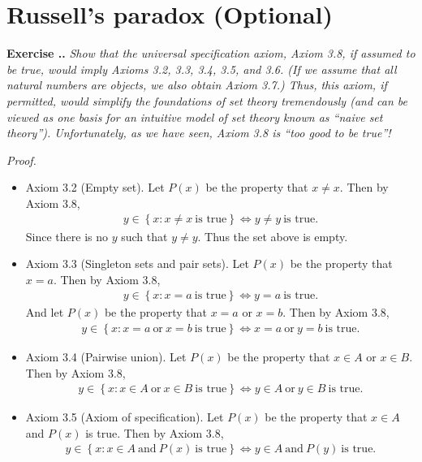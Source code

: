 \documentclass{book}
\newcommand{\pff}{\vspace{.25em}\noindent\emph{Proof.}~~}
\newcounter{Exercise}[section]
\renewcommand{\theExercise}{\thesection.\arabic{Exercise}.}
\newcommand{\new}{\vspace{1.5em}\noindent\textbf{{Exercise \stepcounter{Exercise}\textbf{\theExercise}}} }
\begin{document}
\section{Russell's paradox (Optional)}

\new\emph{Show that the universal specification axiom, Axiom 3.8, if assumed to be true, would imply Axioms 3.2, 3.3, 3.4, 3.5, and 3.6. (If we assume that all natural numbers are objects, we also obtain Axiom 3.7.) Thus, this axiom, if permitted, would simplify the foundations of set theory tremendously (and can be viewed as one basis for an intuitive model of set theory known as ``naive set theory''). Unfortunately, as we have seen, Axiom 3.8 is ``too good to be true''!}

\pff
\begin{itemize}
    \item Axiom 3.2 (Empty set). Let $P(x)$ be the property that $x\neq x$. Then by Axiom 3.8,
    \begin{align*}
        y\in\left\{x:x\neq x\ \textrm{is true}\right\}\iff y\neq y\ \textrm{is true}.
    \end{align*}
Since there is no $y$ such that $y\neq y$. Thus the set above is empty.

    \item Axiom 3.3 (Singleton sets and pair sets). Let $P(x)$ be the property that $x=a$. Then by Axiom 3.8,
    \begin{align*}
        y\in\left\{x:x=a\ \textrm{is true}\right\}\iff y=a\ \textrm{is true}.
    \end{align*}
And let $P(x)$ be the property that $x=a$ or $x=b$. Then by Axiom 3.8,
    \begin{align*}
        y\in\left\{x:x=a\ \textrm{or}\ x=b\ \textrm{is true}\right\}\iff x=a\ \textrm{or}\ y=b\ \textrm{is true}.
    \end{align*}

    \item Axiom 3.4 (Pairwise union). Let $P(x)$ be the property that $x\in A$ or $x\in B$. Then by Axiom 3.8,
    \begin{align*}
        y\in\left\{x:x\in A\ \textrm{or}\ x\in B\ \textrm{is true}\right\}\iff y\in A\ \textrm{or}\ y\in B\ \textrm{is true}.
    \end{align*}

    \item Axiom 3.5 (Axiom of specification). Let $P(x)$ be the property that $x\in A$ and $P(x)$ is true. Then by Axiom 3.8,
    \begin{align*}
        y\in\left\{x:x\in A\ \textrm{and}\ P(x)\ \textrm{is true}\right\}\iff y\in A\ \textrm{and}\ P(y)\ \textrm{is true}.
    \end{align*}


\end{itemize}
\end{document}
